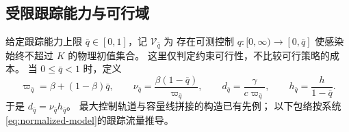 \subsection{受限跟踪能力与可行域}
\label{sec:restricted-feasibility}

给定跟踪能力上限 $\bar q\in[0,1]$，记 $\mathcal V_{\bar q}$ 为
存在可测控制 $q:[0,\infty)\to[0,\bar q]$ 使感染始终不超过 $K$ 的物理初值集合。
这里仅判定约束可行性，不比较可行策略的成本。
当 $0\le\bar q<1$ 时，定义
\begin{equation}
 \varpi_{\bar q}=\beta+(1-\beta)\bar q,\qquad
 \nu_{\bar q}=\frac{\beta(1-\bar q)}{\varpi_{\bar q}},\qquad
 d_{\bar q}=\frac{\gamma}{c\varpi_{\bar q}},\qquad
 h_{\bar q}=\frac{h}{1-\bar q}.
 \label{eq:restricted-constants}
\end{equation}
于是 $d_{\bar q}=\nu_{\bar q}h_{\bar q}$。
最大控制轨道与容量线拼接的构造已有先例\citep{AvramFreddiGoreac2022,FreddiGoreac2024}；
以下包络按系统\eqref{eq:normalized-model}的跟踪流量推导。

